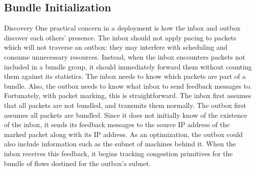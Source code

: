 \subsection{Bundle Initialization}\label{s:impl:discovery}
\begin{outline}
\1 Discovery 
    \2 One practical concern in a \name deployment is how the inbox and outbox discover each others' presence.
    \2 The inbox should not apply pacing to packets which will not traverse an outbox: they may interfere with scheduling and consume unnecessary resources.
        \3 Instead, when the inbox encounters packets not included in a bundle group, it should immediately forward them without counting them against its statistics.
        \3 The inbox needs to know which packets are part of a bundle.
    \2 Also, the outbox needs to know what inbox to send feedback messages to.
    \2 Fortunately, with packet marking, this is straightforward. The inbox first assumes that all packets are not bundled, and transmits them normally.
    \2 The outbox first assumes all packets are bundled. Since it does not initially know of the existence of the inbox, it sends its feedback messages to the source IP address of the marked packet along with its IP address. As an optimization, the outbox could also include information such as the subnet of machines behind it.
        \3 When the inbox receives this feedback, it begins tracking congestion primitives for the bundle of flows destined for the outbox's subnet.
\end{outline}